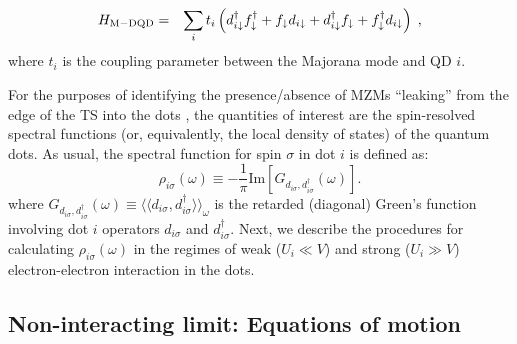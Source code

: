 \documentclass[showpacs,aps,prb,reprint,superscriptaddress]{revtex4-2}
\begin{document}
\begin{eqnarray}
    H_{\rm M-DQD} & = &  
\sum_{i}t_{i} \left(d_{i\downarrow}^{\dagger}f^\dagger_{\downarrow} + 
     f_{\downarrow}d_{i\downarrow} +d_{i\downarrow}^{\dagger}f_{\downarrow}+
     f_{\downarrow}^{\dagger} d_{i\downarrow}\right) \; , 
    \label{eq:H_MDQD}
\end{eqnarray}
where $t_i$ is the coupling parameter between the Majorana mode and QD $i$. %


For the purposes of identifying the presence/absence of MZMs ``leaking'' from the edge of the TS into the dots \cite{liu_detecting_2011,vernek_subtle_2014,ruiz-tijerina_interaction_2015}, the quantities of interest are the spin-resolved spectral functions (or, equivalently, the local density of states) of the quantum dots. As usual, the spectral function for spin $\sigma$ in dot $i$ is defined as:
%
%
\begin{equation}
    \rho_{i \sigma}(\omega)\equiv-\frac{1}{\pi} \textrm{Im} \left[G_{d_{i \sigma},d_{i \sigma}^\dagger}(\omega)\right].
    \label{eq:SpecFunc}
\end{equation}
%
where $G_{d_{i \sigma},d_{i \sigma}^\dagger}(\omega) \equiv \langle\langle d_{i \sigma},d_{i \sigma}^{\dagger} \rangle \rangle_\omega$ is the retarded (diagonal) Green's function involving dot $i$ operators $d_{i \sigma}$ and $d_{i \sigma}^\dagger$. Next, we describe the procedures for calculating  $\rho_{i \sigma}(\omega)$ in the regimes of weak ($U_i \ll V$) and strong ($U_i \! \gg\! V$) electron-electron interaction in the dots.



\subsection{Non-interacting limit: Equations of motion }
\label{sec:non-interactingMethods}
\end{document}
